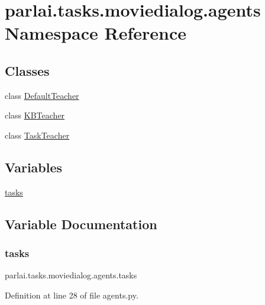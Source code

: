 \hypertarget{namespaceparlai_1_1tasks_1_1moviedialog_1_1agents}{}\section{parlai.\+tasks.\+moviedialog.\+agents Namespace Reference}
\label{namespaceparlai_1_1tasks_1_1moviedialog_1_1agents}
\subsection*{Classes}
\begin{DoxyCompactItemize}
\item 
class \hyperlink{classparlai_1_1tasks_1_1moviedialog_1_1agents_1_1DefaultTeacher}{Default\+Teacher}
\item 
class \hyperlink{classparlai_1_1tasks_1_1moviedialog_1_1agents_1_1KBTeacher}{K\+B\+Teacher}
\item 
class \hyperlink{classparlai_1_1tasks_1_1moviedialog_1_1agents_1_1TaskTeacher}{Task\+Teacher}
\end{DoxyCompactItemize}
\subsection*{Variables}
\begin{DoxyCompactItemize}
\item 
\hyperlink{namespaceparlai_1_1tasks_1_1moviedialog_1_1agents_a7d3456fd665253777153c66528a55ace}{tasks}
\end{DoxyCompactItemize}


\subsection{Variable Documentation}
\mbox{\label{namespaceparlai_1_1tasks_1_1moviedialog_1_1agents_a7d3456fd665253777153c66528a55ace}} 
\subsubsection{\texorpdfstring{tasks}{tasks}}
{\footnotesize\ttfamily parlai.\+tasks.\+moviedialog.\+agents.\+tasks}



Definition at line 28 of file agents.\+py.

